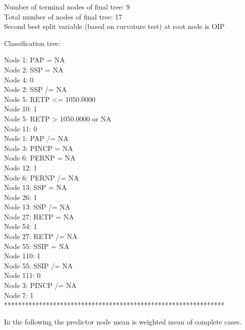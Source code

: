 \documentclass[12pt]{article}
\begin{document}
 Number of terminal nodes of final tree: 9\\
 Total number of nodes of final tree: 17\\
 Second best split variable (based on curvature test) at root node is OIP
  
 Classification tree:
  
 Node 1: PAP = NA\\
   Node 2: SSP = NA\\
     Node 4: 0\\
   Node 2: SSP /= NA\\
     Node 5: RETP <= 1050.0000\\
       Node 10: 1\\
     Node 5: RETP > 1050.0000 or NA\\
       Node 11: 0\\
 Node 1: PAP /= NA\\
   Node 3: PINCP = NA\\
     Node 6: PERNP = NA\\
       Node 12: 1\\
     Node 6: PERNP /= NA\\
       Node 13: SSP = NA\\
         Node 26: 1\\
       Node 13: SSP /= NA\\
         Node 27: RETP = NA\\
           Node 54: 1\\
         Node 27: RETP /= NA\\
           Node 55: SSIP = NA\\
             Node 110: 1\\
           Node 55: SSIP /= NA\\
             Node 111: 0\\
   Node 3: PINCP /= NA\\
     Node 7: 1\\
 
 ***************************************************************
 
 In the following the predictor node mean is weighted mean of complete cases.\\
  
\end{document}
